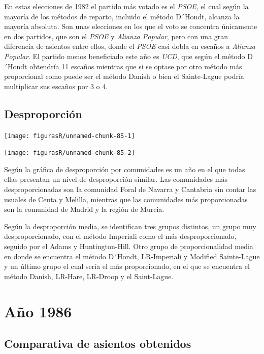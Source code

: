 \documentclass[12pt,a4paper,]{book}
\numberwithin{dummy}{section}
\theoremstyle{ocrenumbox}
\theoremstyle{blacknumex}
\theoremstyle{blacknumbox}
\theoremstyle{ocrenum}
\theoremstyle{ocrenum}
\begin{document}
En estas elecciones de 1982 el partido más votado es el \emph{PSOE}, el
cual según la mayoría de los métodos de reparto, incluido el método
D´Hondt, alcanza la mayoría absoluta. Son unas elecciones en los que el
voto se concentra únicamente en dos partidos, que son el \emph{PSOE} y
\emph{Alianza Popular}, pero con una gran diferencia de asientos entre
ellos, donde el \emph{PSOE} casi dobla en escaños a \emph{Alianza
Popular}. El partido menos beneficiado este año es \emph{UCD}, que según
el método D´Hondt obtendría 11 escaños mientras que si se optase por
otro método más proporcional como puede ser el método Danish o bien el
Sainte-Lague podría multiplicar sus escaños por 3 o 4.

\hypertarget{desproporciuxf3n-2}{%
\subsection{Desproporción}\label{desproporciuxf3n-2}}

\begin{center}\texttt{[image: figurasR/unnamed-chunk-85-1]} \end{center}

\begin{center}\texttt{[image: figurasR/unnamed-chunk-85-2]} \end{center}

Según la gráfica de desproporción por comunidades es un año en el que
todas ellas presentan un nivel de desproporción similar. Las comunidades
más desproporcionadas son la comunidad Foral de Navarra y Cantabria sin
contar las usuales de Ceuta y Melilla, mientras que las comunidades más
proporcionadas son la comunidad de Madrid y la región de Murcia.

Según la desproporción media, se identifican tres grupos distintos, un
grupo muy desproporcionado, con el método Imperiali como el más
desproporcionado, seguido por el Adams y Huntington-Hill. Otro grupo de
proporcionalidad media en donde se encuentra el método D´Hondt,
LR-Imperiali y Modified Sainte-Lague y un último grupo el cual sería el
más proporcionado, en el que se encuentra el método Danish, LR-Hare,
LR-Droop y el Saint-Lague.

\hypertarget{auxf1o-1986}{%
\section{Año 1986}\label{auxf1o-1986}}

\hypertarget{comparativa-de-asientos-obtenidos-3}{%
\subsection{Comparativa de asientos
obtenidos}\label{comparativa-de-asientos-obtenidos-3}}
\end{document}
